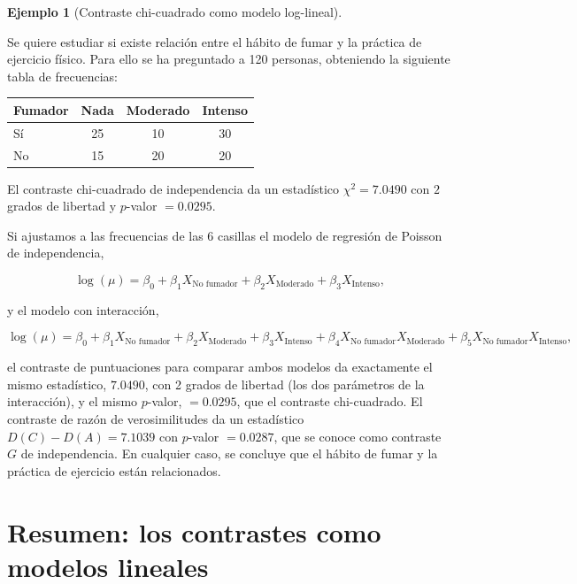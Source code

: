 \documentclass[
  spanish,
  a4paper,
]{scrreport}
\newcounter{none} %
\theoremstyle{plain}
\theoremstyle{definition}
\newtheorem{example}{Ejemplo}[chapter]
\theoremstyle{definition}
\theoremstyle{remark}
\begin{document}
\begin{example}[Contraste chi-cuadrado como modelo
log-lineal]\protect\hypertarget{exm-poisson-chi-cuadrado}{}\label{exm-poisson-chi-cuadrado}

Se quiere estudiar si existe relación entre el hábito de fumar y la
práctica de ejercicio físico. Para ello se ha preguntado a 120 personas,
obteniendo la siguiente tabla de frecuencias:

{\def\LTcaptype{none} %
\begin{longtable}[]{@{}lccc@{}}
\toprule\noalign{}
Fumador & Nada & Moderado & Intenso \\
\midrule\noalign{}
\endhead
\bottomrule\noalign{}
\endlastfoot
Sí & 25 & 10 & 30 \\
No & 15 & 20 & 20 \\
\end{longtable}
}

El contraste chi-cuadrado de independencia da un estadístico
\(\chi^2=7.0490\) con \(2\) grados de libertad y \(p\)-valor
\(= 0.0295\).

Si ajustamos a las frecuencias de las 6 casillas el modelo de regresión
de Poisson de independencia,

\[
\log(\mu) = \beta_0 + \beta_1X_{\text{No fumador}} + \beta_2X_{\text{Moderado}} + \beta_3X_{\text{Intenso}},
\]

y el modelo con interacción,

\[
\log(\mu) = \beta_0 + \beta_1X_{\text{No fumador}} + \beta_2X_{\text{Moderado}} + \beta_3X_{\text{Intenso}} + \beta_4X_{\text{No fumador}}X_{\text{Moderado}} + \beta_5X_{\text{No fumador}}X_{\text{Intenso}},
\]

el contraste de puntuaciones para comparar ambos modelos da exactamente
el mismo estadístico, \(7.0490\), con 2 grados de libertad (los dos
parámetros de la interacción), y el mismo \(p\)-valor, \(= 0.0295\), que
el contraste chi-cuadrado. El contraste de razón de verosimilitudes da
un estadístico \(D(C)-D(A)=7.1039\) con \(p\)-valor \(= 0.0287\), que se
conoce como contraste \(G\) de independencia. En cualquier caso, se
concluye que el hábito de fumar y la práctica de ejercicio están
relacionados.

\end{example}

\section{Resumen: los contrastes como modelos
lineales}\label{resumen-los-contrastes-como-modelos-lineales}
\end{document}
